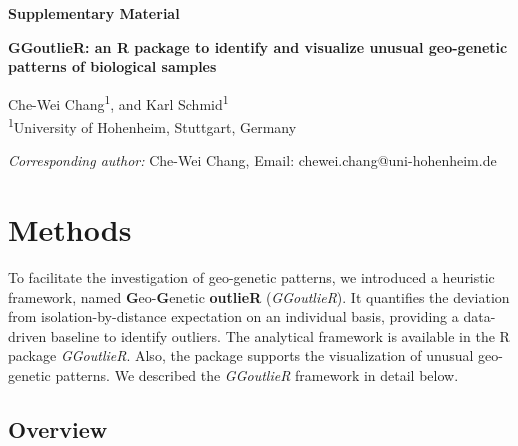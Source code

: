 \documentclass[11pt]{article}
\begin{document}
\begin{flushleft}
\textbf{Supplementary Material}

\textbf{GGoutlieR: an R package to identify and visualize unusual geo-genetic patterns of biological samples}

\vspace{2ex}

Che-Wei Chang\textsuperscript{1}, and Karl Schmid\textsuperscript{1}\\[1ex]

\textsuperscript{1}University of Hohenheim, Stuttgart, Germany\\


\vspace{2ex}

\textit{Corresponding author:} Che-Wei Chang, Email: chewei.chang@uni-hohenheim.de


\end{flushleft}

\newpage




\section*{Methods}

To facilitate the investigation of geo-genetic patterns, we introduced a heuristic framework, named \textbf{G}eo-\textbf{G}enetic \textbf{outlieR} (\textit{GGoutlieR}).
It quantifies the deviation from isolation-by-distance expectation on an individual basis, providing a data-driven baseline to identify outliers.
The analytical framework is available in the R package \textit{GGoutlieR}.
Also, the package supports the visualization of unusual geo-genetic patterns.
We described the \textit{GGoutlieR} framework in detail below.

\subsection*{Overview}
\end{document}
